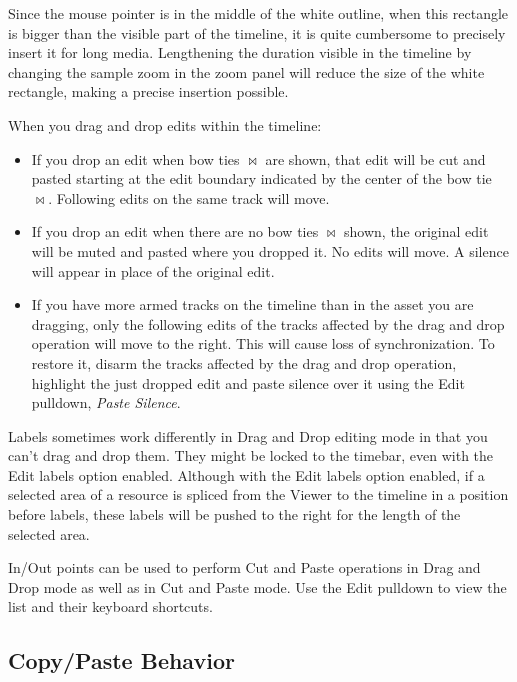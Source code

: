Since the mouse pointer is in the middle of the white outline, when this rectangle is bigger than the visible part of the timeline, it is quite cumbersome to precisely insert it for long media. Lengthening the duration visible in the timeline by changing the sample zoom in the zoom panel will reduce the size of the white rectangle, making a precise insertion possible.

\noindent When you drag and drop edits within the timeline:

\begin{itemize}
    \item If you drop an edit when bow ties $\bowtie$ are shown, that edit will be cut and pasted starting at the edit
    boundary indicated by the center of the bow tie $\bowtie$.  Following edits on the same track will move.
    \item If you drop an edit when there are no bow ties $\bowtie$ shown, the original edit will be muted and pasted
    where you dropped it. No edits will move. A silence will appear in place of the original edit.
    \item If you have more armed tracks on the timeline than in the asset you are dragging, only the following
    edits of the tracks affected by the drag and drop operation will move to the right. This will cause loss
    of synchronization. To restore it, disarm the tracks affected by the drag and drop operation, highlight
    the just dropped edit and paste silence over it using the Edit pulldown, \textit{Paste Silence}.
\end{itemize}

\noindent Labels sometimes work differently in Drag and Drop editing mode in that you can't drag and drop them. They might be locked to the timebar, even with the Edit labels option enabled.  Although with the Edit labels option enabled, if a selected area of a resource is spliced from the Viewer to the timeline in a position before labels, these labels will be pushed to the right for the length of the selected area.

In/Out points can be used to perform Cut and Paste operations in Drag and Drop mode as well as in Cut and Paste mode.  Use the Edit pulldown to view the list and their keyboard shortcuts.

\subsection{Copy/Paste Behavior}%
\label{sub:copy_paste_behavior}

